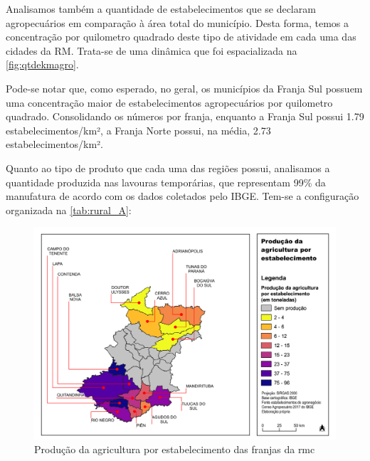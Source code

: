 	Analisamos também a quantidade de estabelecimentos que se declaram agropecuários em comparação à área total do município. Desta forma, temos a concentração por quilometro quadrado deste tipo de atividade em cada uma das cidades da RM. Trata-se de uma dinâmica que foi espacializada na \autoref{fig:qtdekmagro}.
	
	Pode-se notar que, como esperado, no geral, os municípios da Franja Sul possuem uma concentração maior de estabelecimentos agropecuários por quilometro quadrado. Consolidando os números por franja, enquanto a Franja Sul possui 1.79 estabelecimentos/km², a Franja Norte possui, na média, 2.73 estabelecimentos/km². 
	
	Quanto ao tipo de produto que cada uma das regiões possui, analisamos a quantidade produzida nas lavouras temporárias, que representam 99\% da manufatura de acordo com os dados coletados pelo IBGE. Tem-se a configuração organizada na \autoref{tab:rural_A}:
	
	\begin{landscape}
		\begin{figure}
			\centering
			\caption{Produção da agricultura por estabelecimento das franjas da \gls{rmc}}
			\label{fig:qtdeestabagro}
			\includegraphics[width=0.85\linewidth]{../gis/produtos/RMC_censorural_QTD_ESTAB_AGRO}
		\end{figure}
	\end{landscape}
	
